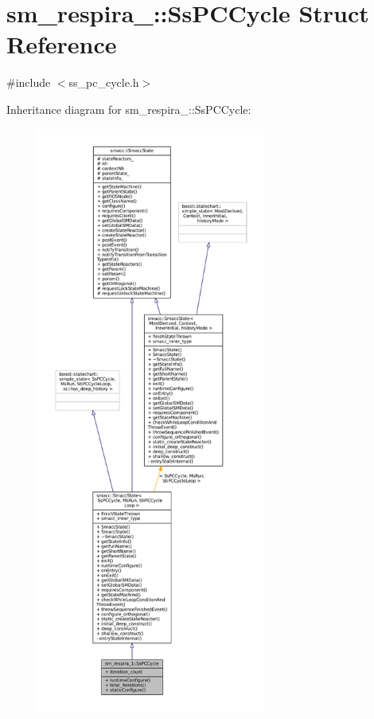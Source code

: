 \hypertarget{structsm__respira__1_1_1SsPCCycle}{}\section{sm\+\_\+respira\+\_\+:\+:Ss\+P\+C\+Cycle Struct Reference}
\label{structsm__respira__1_1_1SsPCCycle}


{\ttfamily \#include $<$ss\+\_\+pc\+\_\+cycle.\+h$>$}



Inheritance diagram for sm\+\_\+respira\+\_\+:\+:Ss\+P\+C\+Cycle\+:
\nopagebreak
\begin{figure}[H]
\begin{center}
\leavevmode
\includegraphics[height=550pt]{structsm__respira__1_1_1SsPCCycle__inherit__graph}
\end{center}
\end{figure}


